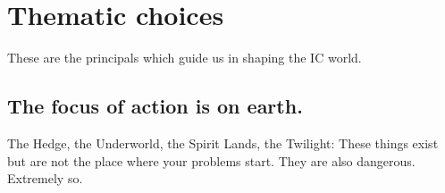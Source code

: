 \section{Thematic choices}
These are the principals which guide us in shaping the IC world.
\subsection{The focus of action is on earth.}
The Hedge, the Underworld, the Spirit Lands, the Twilight: These things exist but are not the place where your problems start. They are also dangerous. Extremely so. 
